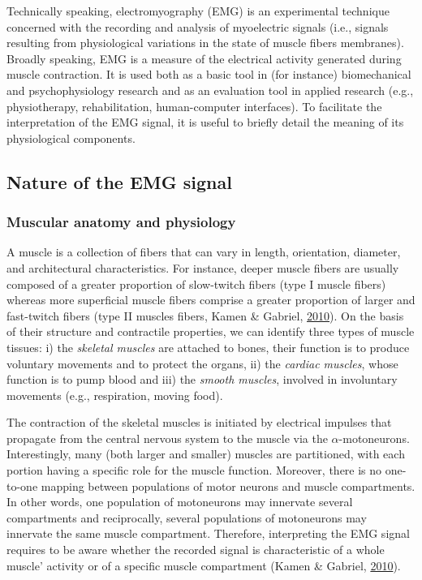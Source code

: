 \documentclass[a4paper,12pt,twoside,openright,oldfontcommands]{memoir}
\begin{document}
Technically speaking, electromyography (EMG) is an experimental technique concerned with the recording and analysis of myoelectric signals (i.e., signals resulting from physiological variations in the state of muscle fibers membranes). Broadly speaking, EMG is a measure of the electrical activity generated during muscle contraction. It is used both as a basic tool in (for instance) biomechanical and psychophysiology research and as an evaluation tool in applied research (e.g., physiotherapy, rehabilitation, human-computer interfaces). To facilitate the interpretation of the EMG signal, it is useful to briefly detail the meaning of its physiological components.

\hypertarget{nature-of-the-emg-signal}{%
\subsection{Nature of the EMG signal}\label{nature-of-the-emg-signal}}

\hypertarget{muscular-anatomy-and-physiology}{%
\subsubsection{Muscular anatomy and physiology}\label{muscular-anatomy-and-physiology}}

A muscle is a collection of fibers that can vary in length, orientation, diameter, and architectural characteristics. For instance, deeper muscle fibers are usually composed of a greater proportion of slow-twitch fibers (type I muscle fibers) whereas more superficial muscle fibers comprise a greater proportion of larger and fast-twitch fibers (type II muscles fibers, Kamen \& Gabriel, \protect\hyperlink{ref-kamen_essentials_2010}{2010}). On the basis of their structure and contractile properties, we can identify three types of muscle tissues: i) the \emph{skeletal muscles} are attached to bones, their function is to produce voluntary movements and to protect the organs, ii) the \emph{cardiac muscles}, whose function is to pump blood and iii) the \emph{smooth muscles}, involved in involuntary movements (e.g., respiration, moving food).

The contraction of the skeletal muscles is initiated by electrical impulses that propagate from the central nervous system to the muscle via the \(\alpha\)-motoneurons. Interestingly, many (both larger and smaller) muscles are partitioned, with each portion having a specific role for the muscle function. Moreover, there is no one-to-one mapping between populations of motor neurons and muscle compartments. In other words, one population of motoneurons may innervate several compartments and reciprocally, several populations of motoneurons may innervate the same muscle compartment. Therefore, interpreting the EMG signal requires to be aware whether the recorded signal is characteristic of a whole muscle' activity or of a specific muscle compartment (Kamen \& Gabriel, \protect\hyperlink{ref-kamen_essentials_2010}{2010}).
\end{document}

